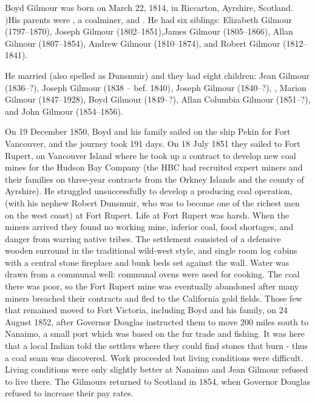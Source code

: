 
Boyd Gilmour was born on March 22, 1814, in Riccarton, Ayrshire, Scotland. \cite{BGbirth})His parents were , a coalminer, and .
He had six siblings: Elizabeth Gilmour (1797--1870), Joseph Gilmour (1802--1851),James Gilmour (1805--1866), Allan Gilmour (1807--1854), Andrew Gilmour (1810--1874),
and Robert Gilmour (1812--1841).

He married  (also spelled as Dunsmuir) and they had eight children:
Jean Gilmour (1836--?), Joseph Gilmour (1838 -- bef. 1840), Joseph Gilmour (1840--?), ,
Marion Gilmour (1847--1928), Boyd Gilmour (1849--?), Allan Columbia Gilmour (1851--?), and John Gilmour (1854--1856).

On 19 December 1850, Boyd and his family sailed on the ship Pekin for Fort Vancouver, and the journey took 191 days. On 18 July 1851 they sailed to Fort Rupert, on Vancouver Island where he took up a contract to develop new coal mines for the Hudson Bay Company (the HBC had recruited expert miners and their families on three-year contracts from the Orkney Islands and the county of Ayrshire). He struggled unsuccessfully to develop a producing coal operation, (with his nephew Robert Dunsmuir, who was to become one of the richest men on the west coast) at Fort Rupert. Life at Fort Rupert was harsh. When the miners arrived they found no working mine, inferior coal, food shortages, and danger from warring native tribes. The settlement consisted of a defensive wooden surround in the traditional wild-west style, and single room log cabins with a central stone fireplace and bunk beds set against the wall. Water was drawn from a communal well: communal ovens were used for cooking. The coal there was poor, so the Fort Rupert mine was eventually abandoned after many miners breached their contracts and fled to the California gold fields. Those few that remained moved to Fort Victoria, including Boyd and his family, on 24 August 1852, after Governor Douglas instructed them to move 200 miles south to Nanaimo, a small port which was based on the fur trade and fishing. It was here that a local Indian told the settlers where they could find stones that burn - thus a coal seam was discovered. Work proceeded but living conditions were difficult. Living conditions were only slightly better at Nanaimo and Jean Gilmour refused to live there. The Gilmours returned to Scotland in 1854, when Governor Douglas refused to increase their pay rates. \cite{BGilmourCanada}

